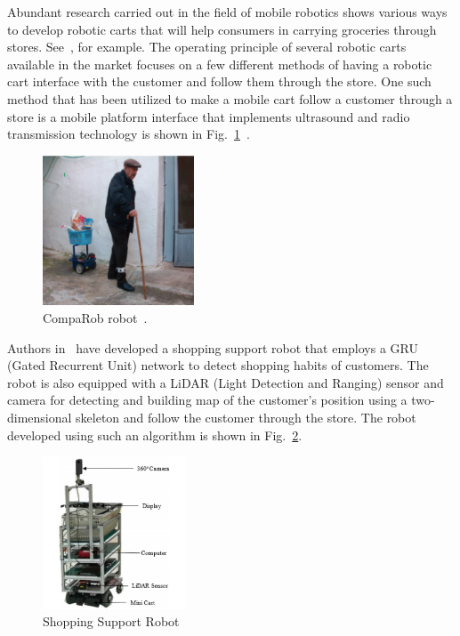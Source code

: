 \documentclass[conference]{IEEEtran}
\begin{document}
Abundant research carried out in the field of mobile robotics shows various ways to develop
robotic carts that will help consumers in carrying groceries through stores.
See~\cite{Rawashdeh2017-Person,islam_lam_fukuda_kobayashi_kuno_2019,Sales2016-CompaRob}, for example. The operating principle of several robotic carts available in the market focuses on a few different methods of having a
robotic cart interface with the customer and follow them through the store. One such method that has been utilized to make a mobile cart follow a customer through a store is a mobile platform interface that implements ultrasound and radio transmission technology is shown in Fig.~\ref{fig:CompaRob}~\cite{Sales2016-CompaRob}. %
%
\begin{figure}[htpb]
   \centering
   \includegraphics[width=0.4\textwidth]{figs/img/CompaRob}
   \caption{CompaRob robot~\cite{Sales2016-CompaRob}.}
   \label{fig:CompaRob}
 \end{figure}
% 
 Authors in~\cite{islam_lam_fukuda_kobayashi_kuno_2019} have developed a shopping
 support robot that employs a GRU (Gated Recurrent Unit) network to detect
 shopping habits of customers. The robot is also equipped with a LiDAR (Light
 Detection and Ranging) sensor and camera for detecting and building map of the
 customer's position using a two-dimensional skeleton and follow the customer
 through the store. The robot developed using such an algorithm is  shown in Fig.~\ref{fig:ShoppingSup}. %
%
\begin{figure}[htpb]
   \centering
   \includegraphics[width=0.38\textwidth]{figs/img/ShoppingSuportRobot}
   \caption{Shopping Support Robot}
   \label{fig:ShoppingSup}
\end{figure}
\end{document}
